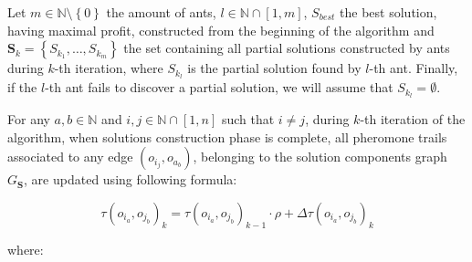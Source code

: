 \documentclass[12pt,a4paper]{report}
\newcommand{\N}{\mathbb{N}}
\newcommand{\SetMinusZero}{\setminus \left\{0\right\}}
\newcommand{\SetFromOneTo}[1]{\N \cap \left[1,#1\right]}
\begin{document}
Let $m \in \N \SetMinusZero$ the amount of ants, $l \in \SetFromOneTo{m}$, $S_{best}$ the best solution, having maximal profit, constructed from the beginning of the algorithm and $\textbf{S}_k = \left\{S_{k_1}, \ldots, S_{k_m} \right\}$ the set containing all partial solutions constructed by ants during $k$-th iteration, where $S_{k_l}$ is the partial solution found by $l$-th ant. Finally, if the $l$-th ant fails to discover a partial solution, we will assume that $S_{k_l} = \emptyset$. 

For any $a,b \in \N$ and $i,j \in \SetFromOneTo{n}$ such that $i \neq j$, during $k$-th iteration of the algorithm, when solutions construction phase is complete, all pheromone trails associated to any edge $(o_{i_j}, o_{a_b})$, belonging to the solution components graph $G_{\textbf{S}}$, are updated using following formula:

\begin{equation}
	\tau(o_{i_a}, o_{j_b})_k = \tau(o_{i_a}, o_{j_b})_{k-1} \cdot \rho + \Delta \tau(o_{i_a}, o_{j_b})_{k} 
\end{equation}

where:
\end{document}
